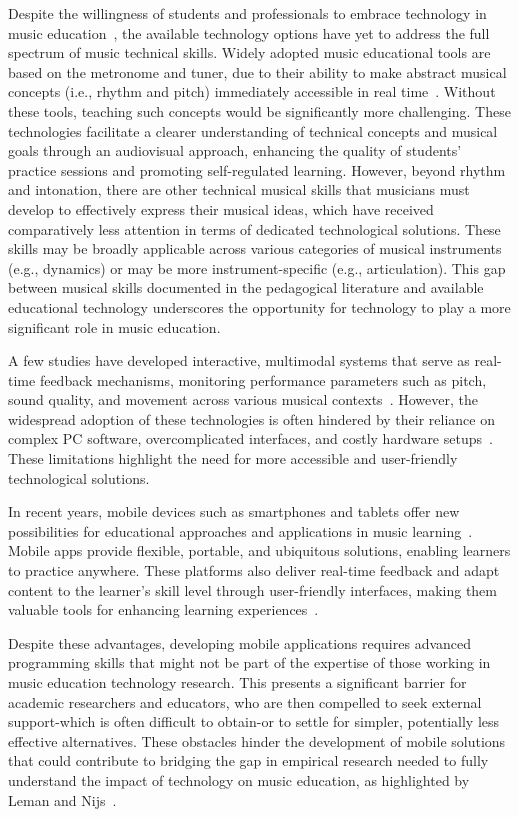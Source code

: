 \documentclass[runningheads]{llncs}
\begin{document}
Despite the willingness of students and professionals to embrace technology in music education~\cite{Waddell19}, the available technology options have yet to address the full spectrum of music technical skills.
Widely adopted music educational tools are based on the metronome and tuner, due to their ability to make abstract musical concepts (i.e., rhythm and pitch) immediately accessible in real time~\cite{Acquilino22}. Without these tools, teaching such concepts would be significantly more challenging. These technologies facilitate a clearer understanding of technical concepts and musical goals through an audiovisual approach, enhancing the quality of students’ practice sessions and promoting self-regulated learning.
However, beyond rhythm and intonation, there are other technical musical skills that musicians must develop to effectively express their musical ideas, which have received comparatively less attention in terms of dedicated technological solutions.
These skills may be broadly applicable across various categories of musical instruments (e.g., dynamics) or may be more instrument-specific (e.g., articulation). This gap between musical skills documented in the pedagogical literature and available educational technology underscores the opportunity for technology to play a more significant role in music education.

A few studies have developed interactive, multimodal systems that serve as real-time feedback mechanisms, monitoring performance parameters such as pitch, sound quality, and movement across various musical contexts~\cite{Romani15,Bandiera16,Brennan16,Blanco21,AcquilinoSMAC}. However, the widespread adoption of these technologies is often hindered by their reliance on complex PC software, overcomplicated interfaces, and costly hardware setups~\cite{Acquilino22}. These limitations highlight the need for more accessible and user-friendly technological solutions.

In recent years, mobile devices such as smartphones and tablets offer new possibilities for educational approaches and applications in music learning~\cite{Nijs14}.
Mobile apps provide flexible, portable, and ubiquitous solutions, enabling learners to practice anywhere. These platforms also deliver real-time feedback and adapt content to the learner's skill level through user-friendly interfaces, making them valuable tools for enhancing learning experiences~\cite{Paule17,Shi23}.

Despite these advantages, developing mobile applications requires advanced programming skills that might not be part of the expertise of those working in music education technology research. This presents a significant barrier for academic researchers and educators, who are then compelled to seek external support-which is often difficult to obtain-or to settle for simpler, potentially less effective alternatives. These obstacles hinder the development of mobile solutions that could contribute to bridging the gap in empirical research needed to fully understand the impact of technology on music education, as highlighted by Leman and Nijs~\cite{Leman17}.
\end{document}
